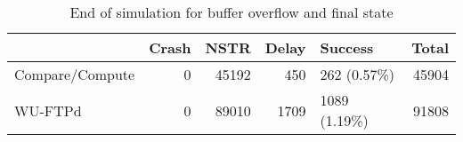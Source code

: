 \begin{table}[H]
\centering
\caption{End of simulation for buffer overflow and final state}
\label{table:end_sim_by_status}
\begin{tabular}{lrrrlr}
\toprule
 & Crash & NSTR & Delay & Success & Total \\
\midrule
Compare/Compute & 0 & 45192 & 450 & 262 (0.57\%) & 45904 \\
WU-FTPd & 0 & 89010 & 1709 & 1089 (1.19\%) & 91808 \\
\bottomrule
\end{tabular}
\end{table}
